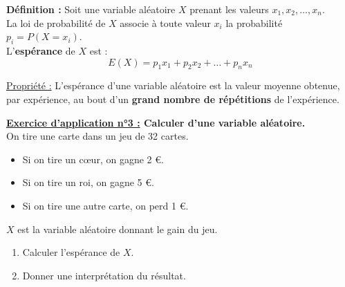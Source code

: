\documentclass[12pt]{article}
\begin{document}
\begin{mdframed}[
    linewidth=1pt,
    roundcorner=5pt,
    linecolor=ForestGreen
]
{\color{ForestGreen}\textbf{Définition :}}
Soit une variable aléatoire $X$ prenant les valeurs $x_1, x_2, \dots, x_n$.\\
La loi de probabilité de $X$ associe à toute valeur $x_i$ la probabilité $p_i = P(X = x_i)$.\\
L'\textbf{espérance} de $X$ est :
\[
E(X) = p_1 x_1 + p_2 x_2 + \dots + p_n x_n
\]
\end{mdframed}

\vspace{5pt}

\begin{mdframed}[
    linewidth=1pt,
    roundcorner=5pt,
    linecolor=Red,
    innertopmargin=10pt,
    innerbottommargin=10pt
]
{\color{red}
\underline{Propriété :}
L'espérance d'une variable aléatoire est la valeur moyenne obtenue, par expérience,
au bout d'un \textbf{grand nombre de répétitions} de l'expérience.
}
\end{mdframed}

\vspace{5pt}

\begin{mdframed}[
    linewidth=1pt,
    roundcorner=5pt,
    linecolor=RoyalBlue,
    innertopmargin=10pt,
    innerbottommargin=10pt
]
{\color{RoyalBlue}\textbf{\underline{Exercice d'application n°3 :} Calculer d'une variable aléatoire.}}
\vspace{5pt}
\\
    On tire une carte dans un jeu de 32 cartes.
    \begin{itemize}
        \item Si on tire un cœur, on gagne 2 €.
        \item Si on tire un roi, on gagne 5 €.
        \item Si on tire une autre carte, on perd 1 €.
    \end{itemize}
    \vspace{5pt}
    $X$ est la variable aléatoire donnant le gain du jeu.
    \begin{enumerate}
        \item Calculer l'espérance de $X$.
        \item Donner une interprétation du résultat.
    \end{enumerate}
\end{mdframed}
\end{document}
